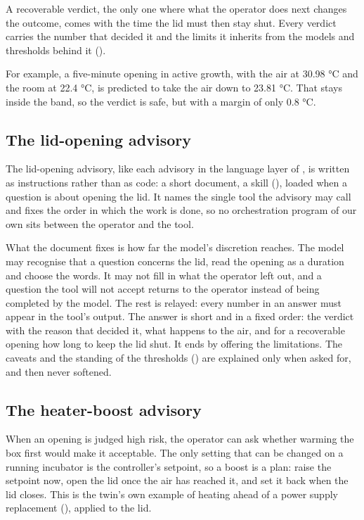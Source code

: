   A recoverable verdict, the only one where what the operator does next changes the outcome, comes
  with the time the lid must then stay shut. Every verdict carries the number that decided it and
  the limits it inherits from the models and thresholds behind it ().

  For example, a five-minute opening in active growth, with the air at 30.98 \si{\celsius} and
  the room at 22.4 \si{\celsius}, is predicted to take the air down to 23.81 \si{\celsius}. That
  stays inside the band, so the verdict is safe, but with a margin of only 0.8 \si{\celsius}.


  \subsection{The lid-opening advisory}
  \label{sec:skill}

  The lid-opening advisory, like each advisory in the language layer of ,
  is written as instructions rather than as code: a short document, a skill
  (), loaded when a question is about opening the lid. It names the single
  tool the advisory may call and fixes the order in which the work is done, so no orchestration
  program of our own sits between the operator and the tool.

  What the document fixes is how far the model's discretion reaches. The model may recognise that
  a question concerns the lid, read the opening as a duration and choose the words. It may not
  fill in what the operator left out, and a question the tool will not accept returns to the
  operator instead of being completed by the model. The rest is relayed: every number in an answer
  must appear in the tool's output. The answer is short and in a fixed order: the verdict with the
  reason that decided it, what happens to the air, and for a recoverable opening how long to keep
  the lid shut. It ends by offering the limitations. The caveats and the standing of the thresholds
  () are explained only when asked for, and then never softened.

  \subsection{The heater-boost advisory}
  \label{sec:boost}

  When an opening is judged high risk, the operator can ask whether warming the box first would make
  it acceptable. The only setting that can be changed on a running incubator is the controller's
  setpoint, so a boost is a plan: raise the setpoint now, open the lid once the air has reached it,
  and set it back when the lid closes. This is the twin's own example of heating ahead of a power
  supply replacement (), applied to the lid.

